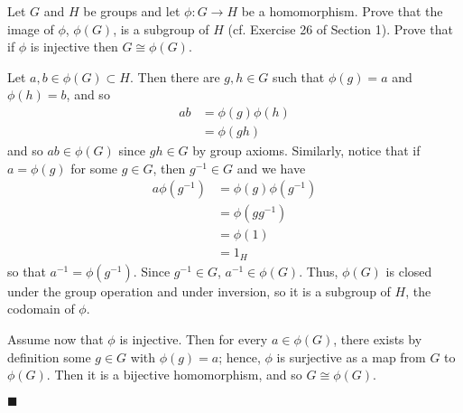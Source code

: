 \documentclass[12pt]{article}
\renewcommand{\qed}{\hfill$\blacksquare$}
\renewenvironment{proof}{\begin{addmargin}[1em]{0em}\begin{newproof}}{\end{newproof}\end{addmargin}\qed}
\newenvironment{problem}[2][Exercise]{\begin{trivlist}
\item[\hskip \labelsep {\bfseries #1}\hskip \labelsep {\bfseries #2.}]}{\end{trivlist}}
\begin{document}
\begin{problem}{1.6.13}
Let $G$ and $H$ be groups and let $\phi:G\rightarrow H$ be a homomorphism. Prove that the image of $\phi$, $\phi\left(G\right)$, is a subgroup of $H$ (cf. Exercise 26 of Section 1). Prove that if $\phi$ is injective then $G \cong \phi\left(G\right)$.
\end{problem}
\begin{proof}
Let $a,b\in \phi\left(G\right)\subset H$. Then there are $g,h\in G$ such that $\phi\left(g\right)=a$ and $\phi\left(h\right)=b$, and so
\begin{equation*}
    \begin{split}
        ab & = \phi\left(g\right)\phi\left(h\right) \\
        & = \phi\left(gh\right)
    \end{split}
\end{equation*}
and so $ab\in\phi\left(G\right)$ since $gh\in G$ by group axioms. Similarly, notice that if $a = \phi\left(g\right)$ for some $g\in G$, then $g^{-1}\in G$ and we have
\begin{equation*}
    \begin{split}
        a\phi\left(g^{-1}\right) & = \phi\left(g\right)\phi\left(g^{-1}\right) \\
        & = \phi\left(gg^{-1}\right) \\
        & = \phi\left(1\right) \\
        & = 1_H
    \end{split}
\end{equation*}
so that $a^{-1} = \phi\left(g^{-1}\right)$. Since $g^{-1}\in G$, $a^{-1}\in\phi\left(G\right)$. Thus, $\phi\left(G\right)$ is closed under the group operation and under inversion, so it is a subgroup of $H$, the codomain of $\phi$.

Assume now that $\phi$ is injective. Then for every $a\in\phi\left(G\right)$, there exists by definition some $g\in G$ with $\phi\left(g\right)=a$; hence, $\phi$ is surjective as a map from $G$ to $\phi\left(G\right)$. Then it is a bijective homomorphism, and so $G\cong \phi\left(G\right)$.
\end{proof}
\end{document}
